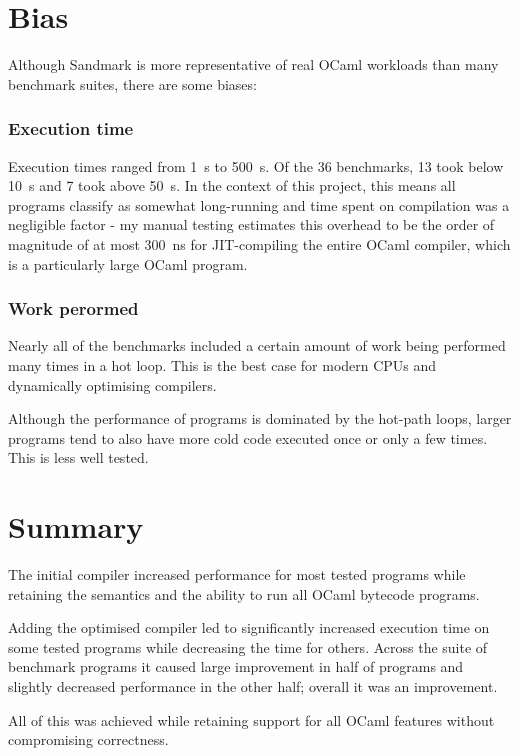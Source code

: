 \section{Bias}

Although Sandmark is more representative of real OCaml workloads than many benchmark suites, there
are some biases:

\subsubsection{Execution time} \label{bias-exec-time}

Execution times ranged from \SI{1}{\second} to \SI{500}{\second}. Of the 36 benchmarks, 13 took
below \SI{10}{\second} and 7 took above \SI{50}{\second}.  In the context of this project, this
means all programs classify as somewhat long-running and time spent on compilation was a negligible
factor - my manual testing estimates this overhead to be the order of magnitude of at most
\SI{300}{\nano\second} for JIT-compiling the entire OCaml compiler, which is a particularly large
OCaml program.

\subsubsection{Work perormed}

Nearly all of the benchmarks included a certain amount of work being performed many times in a hot
loop. This is the best case for modern CPUs and dynamically optimising compilers.

Although the performance of programs is dominated by the hot-path loops, larger programs tend to
also have more cold code executed once or only a few times. This is less well tested.

\section{Summary}

The initial compiler increased performance for most tested programs while retaining the semantics
and the ability to run all OCaml bytecode programs.

Adding the optimised compiler led to significantly increased execution time on some tested programs
while decreasing the time for others. Across the suite of benchmark programs it caused large
improvement in half of programs and slightly decreased performance in the other half; overall it
was an improvement.

All of this was achieved while retaining support for all OCaml features without compromising
correctness.